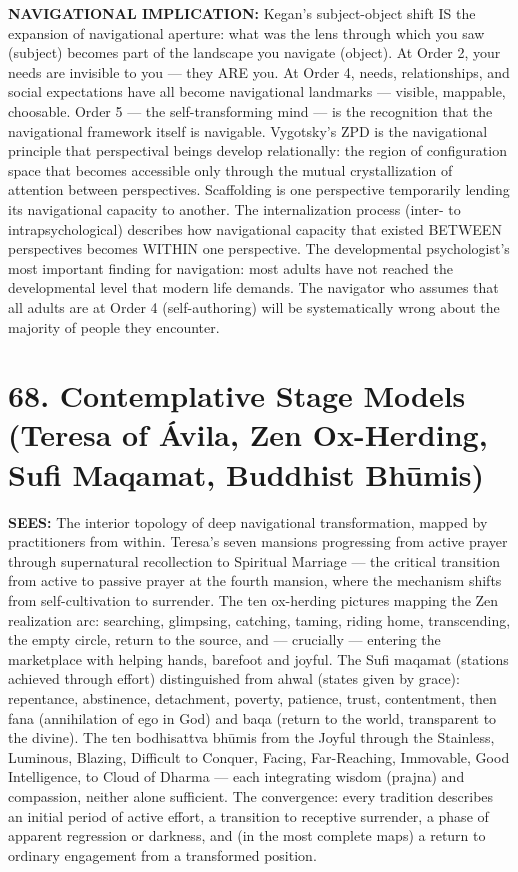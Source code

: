 \textbf{NAVIGATIONAL IMPLICATION:} Kegan's subject-object shift IS the expansion of navigational aperture: what was the lens through which you saw (subject) becomes part of the landscape you navigate (object). At Order 2, your needs are invisible to you — they ARE you. At Order 4, needs, relationships, and social expectations have all become navigational landmarks — visible, mappable, choosable. Order 5 — the self-transforming mind — is the recognition that the navigational framework itself is navigable. Vygotsky's ZPD is the navigational principle that perspectival beings develop relationally: the region of configuration space that becomes accessible only through the mutual crystallization of attention between perspectives. Scaffolding is one perspective temporarily lending its navigational capacity to another. The internalization process (inter- to intrapsychological) describes how navigational capacity that existed BETWEEN perspectives becomes WITHIN one perspective. The developmental psychologist's most important finding for navigation: most adults have not reached the developmental level that modern life demands. The navigator who assumes that all adults are at Order 4 (self-authoring) will be systematically wrong about the majority of people they encounter.


\bigskip\noindent\makebox[\textwidth]{\color{rulegray}\rule{5cm}{0.3pt}}\bigskip


\section*{68. Contemplative Stage Models (Teresa of Ávila, Zen Ox-Herding, Sufi Maqamat, Buddhist Bhūmis)}


\textbf{SEES:} The interior topology of deep navigational transformation, mapped by practitioners from within. Teresa's seven mansions progressing from active prayer through supernatural recollection to Spiritual Marriage — the critical transition from active to passive prayer at the fourth mansion, where the mechanism shifts from self-cultivation to surrender. The ten ox-herding pictures mapping the Zen realization arc: searching, glimpsing, catching, taming, riding home, transcending, the empty circle, return to the source, and — crucially — entering the marketplace with helping hands, barefoot and joyful. The Sufi maqamat (stations achieved through effort) distinguished from ahwal (states given by grace): repentance, abstinence, detachment, poverty, patience, trust, contentment, then fana (annihilation of ego in God) and baqa (return to the world, transparent to the divine). The ten bodhisattva bhūmis from the Joyful through the Stainless, Luminous, Blazing, Difficult to Conquer, Facing, Far-Reaching, Immovable, Good Intelligence, to Cloud of Dharma — each integrating wisdom (prajna) and compassion, neither alone sufficient. The convergence: every tradition describes an initial period of active effort, a transition to receptive surrender, a phase of apparent regression or darkness, and (in the most complete maps) a return to ordinary engagement from a transformed position.


